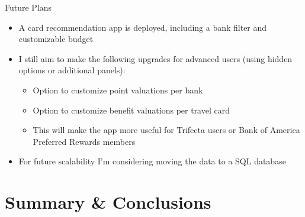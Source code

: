 \begin{frame}{Future Plans}
    \begin{itemize}
        \item A card recommendation app is deployed, including a bank filter and customizable budget
        \bigskip
        \item I still aim to make the following upgrades for advanced users (using hidden options or additional panels):
        \begin{itemize}
            \item Option to customize point valuations per bank
            \item Option to customize benefit valuations per travel card
            \item This will make the app more useful for Trifecta users or Bank of America Preferred Rewards members 
        \end{itemize}
        \bigskip
        \item For future scalability I'm considering moving the data to a SQL database
    \end{itemize}
\end{frame}

%
%


\section{Summary \& Conclusions}

